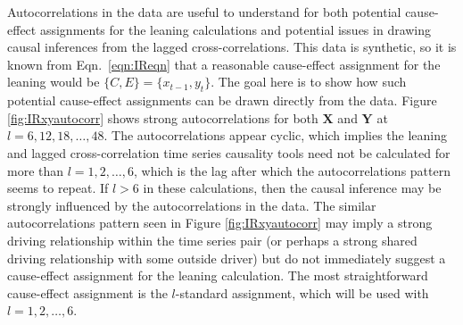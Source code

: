 \documentclass{article}[10pt]
\begin{document}
Autocorrelations in the data are useful to understand for both potential cause-effect assignments for the leaning calculations and potential issues in drawing causal inferences from the lagged cross-correlations.  This data is synthetic, so it is known from Eqn.\ \ref{eqn:IReqn} that a reasonable cause-effect assignment for the leaning would be $\{C,E\}=\{x_{t-1},y_t\}$.  The goal here is to show how such potential cause-effect assignments can be drawn directly from the data.  Figure \ref{fig:IRxyautocorr} shows strong autocorrelations for both $\mathbf{X}$ and $\mathbf{Y}$ at $l=6,12,18,\ldots,48$.  The autocorrelations appear cyclic, which implies the leaning and lagged cross-correlation time series causality tools need not be calculated for more than $l=1,2,\ldots,6$, which is the lag after which the autocorrelations pattern seems to repeat. If $l>6$ in these calculations, then the causal inference may be strongly influenced by the autocorrelations in the data.  The similar autocorrelations pattern seen in Figure \ref{fig:IRxyautocorr} may imply a strong driving relationship within the time series pair (or perhaps a strong shared driving relationship with some outside driver) but do not immediately suggest a cause-effect assignment for the leaning calculation.  The most straightforward cause-effect assignment is the $l$-standard assignment, which will be used with $l = 1,2,\ldots,6$. 
\end{document}
